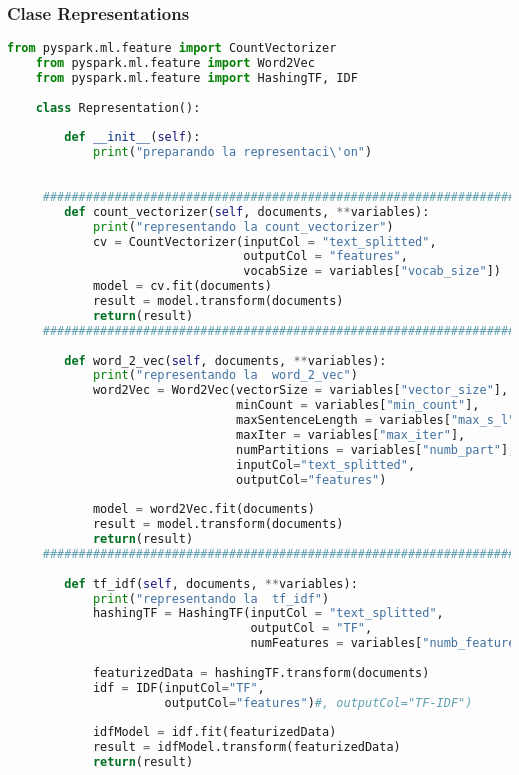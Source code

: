 \documentclass[12pt]{article}
\begin{document}
		
	\subsubsection*{ Clase Representations}	
	\begin{lstlisting}[language=Python, caption = Clase Representations]
	from pyspark.ml.feature import CountVectorizer
	from pyspark.ml.feature import Word2Vec
	from pyspark.ml.feature import HashingTF, IDF
	
	class Representation():
	    
	    def __init__(self):
	        print("preparando la representaci\'on")
	    
	        
	 ##############################################################################
	    def count_vectorizer(self, documents, **variables):
	        print("representando la count_vectorizer")
	        cv = CountVectorizer(inputCol = "text_splitted", 
	                             outputCol = "features", 
	                             vocabSize = variables["vocab_size"])
	        model = cv.fit(documents)
	        result = model.transform(documents)
	        return(result)
	 ##############################################################################
	
	    def word_2_vec(self, documents, **variables):
	        print("representando la  word_2_vec")
	        word2Vec = Word2Vec(vectorSize = variables["vector_size"], 
	                            minCount = variables["min_count"],
	                            maxSentenceLength = variables["max_s_l"],
	                            maxIter = variables["max_iter"], 
	                            numPartitions = variables["numb_part"],
	                            inputCol="text_splitted", 
	                            outputCol="features")
	        
	        model = word2Vec.fit(documents)
	        result = model.transform(documents)
	        return(result)
	 ##############################################################################
	
	    def tf_idf(self, documents, **variables):
	        print("representando la  tf_idf")
	        hashingTF = HashingTF(inputCol = "text_splitted", 
	                              outputCol = "TF", 
	                              numFeatures = variables["numb_features"])
	        
	        featurizedData = hashingTF.transform(documents)
	        idf = IDF(inputCol="TF", 
	                  outputCol="features")#, outputCol="TF-IDF")
	        
	        idfModel = idf.fit(featurizedData)
	        result = idfModel.transform(featurizedData)
	        return(result)
	\end{lstlisting}
	
\end{document}
